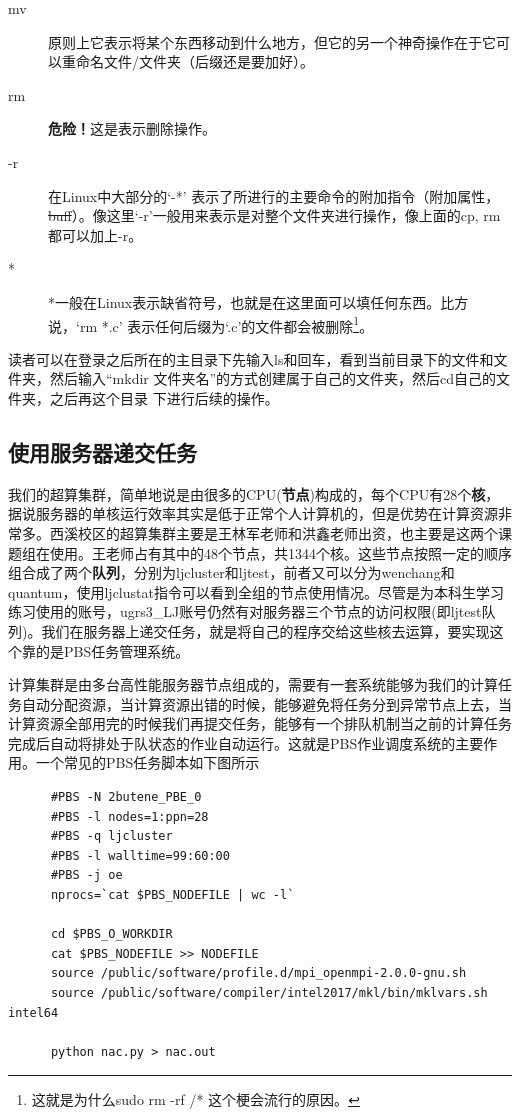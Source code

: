 \documentclass{article}
\numberwithin{equation}{section}
\begin{document}
\begin{description}
    \item[mv] 原则上它表示将某个东西移动到什么地方，但它的另一个神奇操作在于它可以重命名文件/文件夹（后缀还是要加好）。

    \item[rm] \textbf{ 危险！}这是表示删除操作。

    \item[-r] 在Linux中大部分的`-*' 表示了所进行的主要命令的附加指令（附加属性，\sout{buff}）。像这里`-r'一般用来表示是对整个文件夹进行操作，像上面的cp, rm 都可以加上-r。

    \item[*] *一般在Linux表示缺省符号，也就是在这里面可以填任何东西。比方说，`rm *.c' 表示任何后缀为`.c'的文件都会被删除\footnote{这就是为什么sudo rm -rf /* 这个梗会流行的原因。}。

    \end{description}

    读者可以在登录之后所在的主目录下先输入ls和回车，看到当前目录下的文件和文件夹，然后输入“mkdir 文件夹名”的方式创建属于自己的文件夹，然后cd自己的文件夹，之后再这个目录
    下进行后续的操作。
    \subsection{使用服务器递交任务}
    我们的超算集群，简单地说是由很多的CPU(\textbf{节点})构成的，每个CPU有28个\textbf{核}，据说服务器的单核运行效率其实是低于正常个人计算机的，但是优势在计算资源非常多。西溪校区的超算集群主要是王林军老师和洪鑫老师出资，也主要是这两个课题组在使用。王老师占有其中的48个节点，共1344个核。这些节点按照一定的顺序组合成了两个\textbf{队列}，分别为ljcluster和ljtest，前者又可以分为wenchang和quantum，使用ljclustat指令可以看到全组的节点使用情况。尽管是为本科生学习练习使用的账号，ugrs3\_LJ账号仍然有对服务器三个节点的访问权限(即ljtest队列)。我们在服务器上递交任务，就是将自己的程序交给这些核去运算，要实现这个靠的是PBS任务管理系统。
    
    计算集群是由多台高性能服务器节点组成的，需要有一套系统能够为我们的计算任务自动分配资源，当计算资源出错的时候，能够避免将任务分到异常节点上去，当计算资源全部用完的时候我们再提交任务，能够有一个排队机制当之前的计算任务完成后自动将排处于队状态的作业自动运行。这就是PBS作业调度系统的主要作用。一个常见的PBS任务脚本如下图所示
    \begin{lstlisting}
      #PBS -N 2butene_PBE_0
      #PBS -l nodes=1:ppn=28
      #PBS -q ljcluster
      #PBS -l walltime=99:60:00
      #PBS -j oe
      nprocs=`cat $PBS_NODEFILE | wc -l`
      
      cd $PBS_O_WORKDIR
      cat $PBS_NODEFILE >> NODEFILE
      source /public/software/profile.d/mpi_openmpi-2.0.0-gnu.sh
      source /public/software/compiler/intel2017/mkl/bin/mklvars.sh intel64
      
      python nac.py > nac.out
    \end{lstlisting}
\end{document}
